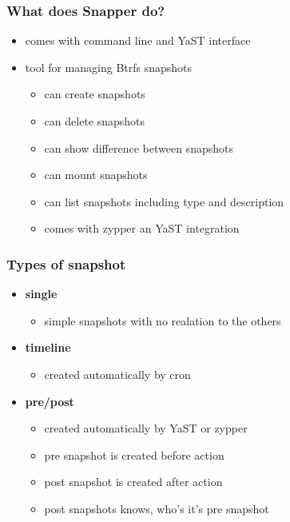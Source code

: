 \documentclass{beamer}
\begin{document}

\begin{frame}[t]
\frametitle{What does Snapper do?}
\begin{itemize}
   \item comes with command line and YaST interface
   \item tool for managing Btrfs snapshots
   \begin{itemize}
      \item can create snapshots
      \item can delete snapshots
      \item can show difference between snapshots
      \item can mount snapshots
      \item can list snapshots including type and description
      \item comes with zypper an YaST integration
   \end{itemize}
\end{itemize}
\end{frame}

\begin{frame}[t]
\frametitle{Types of snapshot}
\begin{itemize}
   \item \textbf{single}
   \begin{itemize}
      \item simple snapshots with no realation to the others
   \end{itemize}
   \item \textbf{timeline}
   \begin{itemize}
      \item created automatically by cron
   \end{itemize}
   \item \textbf{pre/post}
   \begin{itemize}
      \item created automatically by YaST or zypper
      \item pre snapshot is created before action
      \item post snapshot is created after action
      \item post snapshots knows, who's it's pre snapshot
   \end{itemize}
\end{itemize}
\end{frame}
\end{document}
